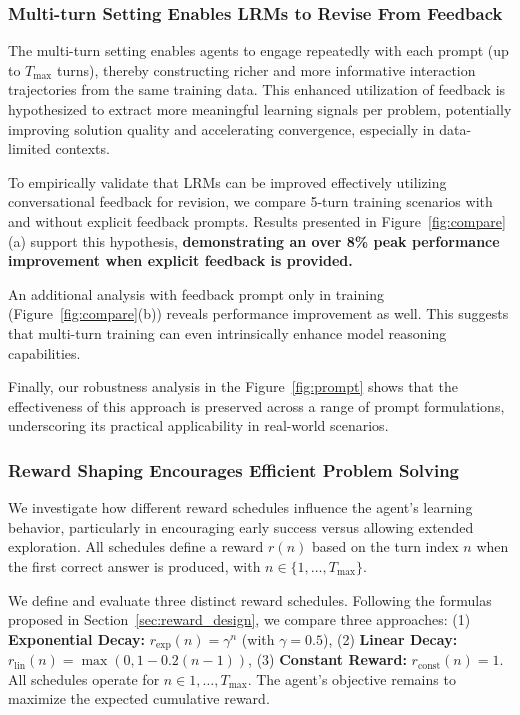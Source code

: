 \subsubsection{Multi-turn Setting Enables LRMs to Revise From Feedback}
\label{sec:4.2.2}

The multi-turn setting enables agents to engage repeatedly with each prompt (up to $T_{\text{max}}$ turns), thereby constructing richer and more informative interaction trajectories from the same training data. This enhanced utilization of feedback is hypothesized to extract more meaningful learning signals per problem, potentially improving solution quality and accelerating convergence, especially in data-limited contexts.

To empirically validate that LRMs can be improved effectively utilizing conversational feedback for revision, we compare 5-turn training scenarios with and without explicit feedback prompts. Results presented in Figure~\ref{fig:compare}(a) support this hypothesis, \textbf{demonstrating an over 8\% peak performance improvement when explicit feedback is provided.}

An additional analysis with feedback prompt only in training (Figure~\ref{fig:compare}(b)) reveals performance improvement as well. This suggests that multi-turn training can even intrinsically enhance model reasoning capabilities.

Finally, our robustness analysis in the Figure~\ref{fig:prompt} shows that the effectiveness of this approach is preserved across a range of prompt formulations, underscoring its practical applicability in real-world scenarios.

\subsubsection{Reward Shaping Encourages Efficient Problem Solving}
\label{sec:analysis_reward_decay}
\label{sec:4.2.3}

We investigate how different reward schedules influence the agent's learning behavior, particularly in encouraging early success versus allowing extended exploration. All schedules define a reward $r(n)$ based on the turn index $n$ when the first correct answer is produced, with $n \in \{1, \dots, T_{\text{max}}\}$.

We define and evaluate three distinct reward schedules. Following the formulas proposed in Section~\ref{sec:reward_design}, we compare three approaches: (1) \textbf{Exponential Decay:} $r_{\text{exp}}(n) = \gamma^n$ (with $\gamma=0.5$), (2) \textbf{Linear Decay:} $r_{\text{lin}}(n) = \max(0, 1 - 0.2(n-1))$, (3) \textbf{Constant Reward:} $r_{\text{const}}(n) = 1.$
All schedules operate for $n \in {1, \dots, T_{\text{max}}}$.
The agent's objective remains to maximize the expected cumulative reward.

